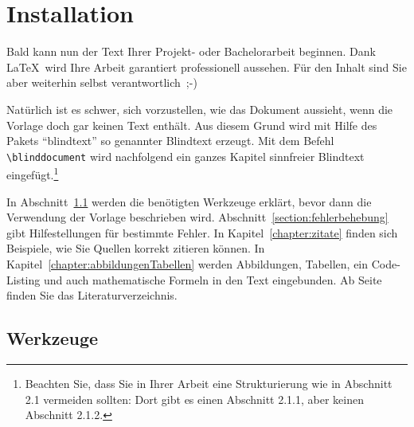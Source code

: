 \chapter{Installation}\label{chapter:Installation}

Bald kann nun der Text Ihrer Projekt- oder Bachelorarbeit beginnen. Dank \LaTeX\ wird Ihre Arbeit garantiert professionell aussehen. Für den Inhalt sind Sie aber weiterhin selbst verantwortlich~\mbox{;-)}

Natürlich ist es schwer, sich vorzustellen, wie das Dokument aussieht, wenn die Vorlage doch gar keinen Text enthält. Aus diesem Grund wird mit Hilfe des Pakets \enquote{blindtext} so genannter Blindtext erzeugt. Mit dem Befehl \verb|\blinddocument| wird nachfolgend ein ganzes Kapitel sinnfreier Blindtext eingefügt.\footnote{Beachten Sie, dass Sie in Ihrer Arbeit eine Strukturierung wie in Abschnitt 2.1 vermeiden sollten: Dort gibt es einen Abschnitt 2.1.1, aber keinen Abschnitt 2.1.2.} 

In Abschnitt~\ref{section:werkzeuge} werden die benötigten Werkzeuge erklärt, bevor dann die Verwendung der Vorlage beschrieben wird. Abschnitt~\ref{section:fehlerbehebung} gibt Hilfestellungen für bestimmte Fehler. In Kapitel~\ref{chapter:zitate} finden sich Beispiele, wie Sie Quellen korrekt zitieren können. In Kapitel~\ref{chapter:abbildungenTabellen} werden Abbildungen, Tabellen, ein Code-Listing und auch mathematische Formeln in den Text eingebunden. Ab Seite~\pageref{chapter:quellen} finden Sie das Literaturverzeichnis.


\section{Werkzeuge}\label{section:werkzeuge}

